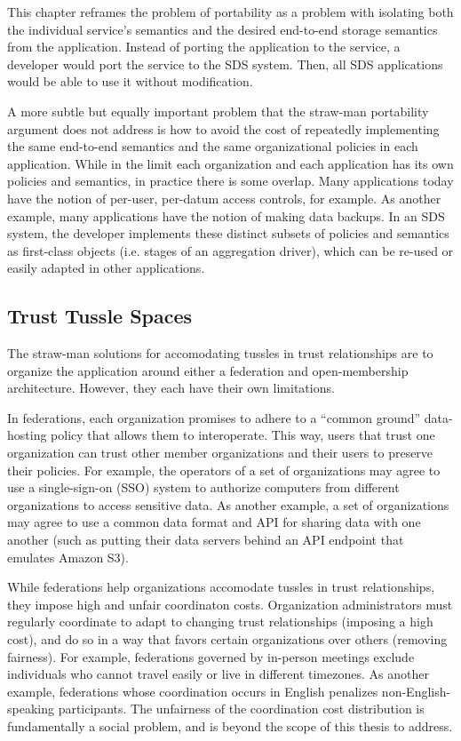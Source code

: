 This chapter reframes the problem of portability as a problem with isolating
both the individual service's semantics and the desired end-to-end storage
semantics from the application.  Instead of porting the application to the
service, a developer would port the service to the SDS system.  Then, all SDS
applications would be able to use it without modification.

A more subtle but equally important problem that the straw-man portability
argument does not address is how to avoid the cost of repeatedly implementing
the same end-to-end semantics and the same organizational policies in each
application.  While in the limit each organization and each application has its
own policies and semantics, in practice there is some overlap.  Many
applications today have the notion of per-user, per-datum access controls,
for example.  As another example, many applications have
the notion of making data backups.  In an SDS system, the developer implements
these distinct subsets of policies and semantics as first-class objects (i.e.
stages of an aggregation driver), which can be re-used or easily adapted
in other applications.

\subsection{Trust Tussle Spaces}

The straw-man solutions for accomodating tussles in trust relationships 
are to organize the application around either a federation and open-membership architecture.
However, they each have their own limitations.

In federations, each organization promises to adhere to a
``common ground'' data-hosting policy that allows them to interoperate.
This way, users that trust one organization can trust other member organizations
and their users to preserve their policies.
For example, the operators of a set of organizations may agree to use a
single-sign-on (SSO) system to authorize computers from different organizations
to access sensitive data.  As another example, a set of organizations may agree
to use a common data format and API for sharing data with one another (such as
putting their data servers behind an API endpoint that emulates Amazon S3).

While federations help organizations accomodate
tussles in trust relationships, they impose high and unfair coordinaton costs.
Organization administrators must regularly coordinate to adapt
to changing trust relationships (imposing a high cost), and do so in a way that
favors certain organizations over others (removing fairness).  For example,
federations governed by in-person meetings exclude individuals who cannot
travel easily or live in different timezones.
As another example, federations whose coordination occurs in English
penalizes non-English-speaking participants.  The unfairness of the
coordination cost distribution is fundamentally a social problem, and is beyond
the scope of this thesis to address.

